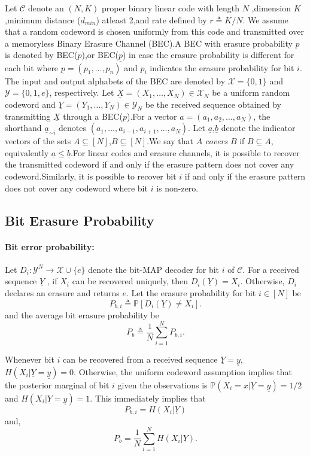 \documentclass[
10pt, %
a4paper, %
oneside, %
headinclude,footinclude, %
BCOR5mm, %
]{scrartcl}
\begin{document}
Let $\mathcal{C}$ denote an $(N, K)$ proper binary linear code with length $N$ ,dimension $K$ ,minimum distance ($d_{min}$) atleast 2,and rate defined by $r \triangleq K/N$. We assume that a random codeword is chosen uniformly from this code and transmitted over a memoryless Binary Erasure Channel (BEC).A BEC with erasure probability $p$ is denoted by BEC($p$),or BEC($\underline{p}$) in case the erasure probability is different for each bit where $\underline{p} = (p_1 , \ldots , p_n)$ and
$p_i$ indicates the erasure probability for bit $i$.
The input and output alphabets of the BEC are denoted by $\mathcal{X} = \{0, 1\}$ and $\mathcal{Y} = \{0, 1, e\}$, respectively. Let $\underline{X} = (X_1 , \ldots , X_N) \in \mathcal{X}_N$ be a uniform random codeword and
$\underline{Y} = (Y_1 , \ldots, Y_N) \in \mathcal{Y}_N$ be the received sequence obtained by transmitting $\underline{X}$ through a BEC($p$).For a vector $a = (a_1 , a_2 , \ldots , a_N)$, the shorthand $\underline{a}_{\sim i}$ denotes
$(a_1 , \ldots , a_{i-1} , a_{i+1}, \ldots , a_N)$.
Let $\underline{a}$,$\underline{b}$ denote the indicator vectors of the sets $A \subseteq [N]$,$B \subseteq [N]$.We say that $A$ \emph{covers} $B$ if $B \subseteq A$, equivalently  $\underline{a}\leq\underline{b}$.For linear codes and erasure channels, it is possible to recover the transmitted codeword if and only if the erasure
pattern does not cover any codeword.Similarly,
it is possible to recover bit $i$ if and only if the erasure
pattern does not cover any codeword where bit $i$ is non-zero.


\subsection*{Bit Erasure Probability} 
\paragraph*{Bit error probability:}Let $D_i : \mathcal{Y}^N \to \mathcal{X} \cup \{e\}$ denote the bit-MAP decoder for bit $i$ of $\mathcal{C}$. For a received sequence $\underline{Y}$ , if $X_i$ can be recovered uniquely, then $D_i(\underline{Y}) = X_i$. Otherwise, $D_i$ declares an erasure and returns $e$. Let the erasure probability for bit $i \in [N]$ be $$P_{b,i} \triangleq \mathbb{P}[D_i(\underline{Y}) \neq X_i].$$ and the average bit erasure probability be $$P_b \triangleq \frac{1}{N}\sum_{i=1}^N P_{b,i}.$$

Whenever bit $i$ can be recovered from a received sequence $\underline{Y}=\underline{y}$, $H(X_i | \underline{Y}=\underline{y}) = 0$. Otherwise, the uniform codeword assumption implies that the posterior marginal of bit $i$ given the observations is $\mathbb{P}(X_i = x|\underline{Y}=\underline{y}) = 1/2$ and $H(X_i |\underline{Y}=\underline{y}) = 1$. This immediately implies that $$P_{b,i} = H(X_i|\underline{Y})$$ and, $$P_b = \frac{1}{N}\sum_{i=1}^N  H(X_i|\underline{Y}).$$
\end{document}
